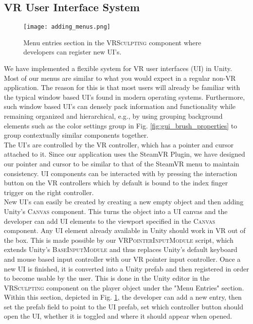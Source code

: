 \subsection{VR User Interface System}

\begin{figure}
\centering
\captionsetup{width=0.8\textwidth}
\texttt{[image: adding\_menus.png]}
\caption{Menu entries section in the \textsc{VRSculpting} component where developers can register new UI's.}
\label{fig:adding_menus}
\end{figure}

We have implemented a flexible system for VR user interfaces (UI) in Unity. Most of our menus are similar to what you would expect in a regular non-VR application. The reason for this is that most users will already be familiar with the typical window based UI's found in modern operating systems. Furthermore, such window based UI's can densely pack information and functionality while remaining organized and hierarchical, e.g., by using grouping background elements such as the color settings group in Fig. \ref{fig:gui_brush_properties} to group contextually similar components together.\\
The UI's are controlled by the VR controller, which has a pointer and cursor attached to it. Since our application uses the SteamVR Plugin, we have designed our pointer and cursor to be similar to that of the SteamVR menu to maintain consistency. UI components can be interacted with by pressing the interaction button on the VR controllers which by default is bound to the index finger trigger on the right controller.\\
New UI's can easily be created by creating a new empty object and then adding Unity's \textsc{Canvas} component. This turns the object into a UI canvas and the developer can add UI elements to the viewport specified in the \textsc{Canvas} component. Any UI element already available in Unity should work in VR out of the box. This is made possible by our \textsc{VRPointerInputModule} script, which extends Unity's \textsc{BaseInputModule} and thus replaces Unity's default keyboard and mouse based input controller with our VR pointer input controller. Once a new UI is finished, it is converted into a Unity prefab and then registered in order to become usable by the user. This is done in the Unity editor in the \textsc{VRSculpting} component on the player object under the "Menu Entries" section. Within this section, depicted in Fig. \ref{fig:adding_menus}, the developer can add a new entry, then set the prefab field to point to the UI prefab, set which controller button should open the UI, whether it is toggled and where it should appear when opened.

